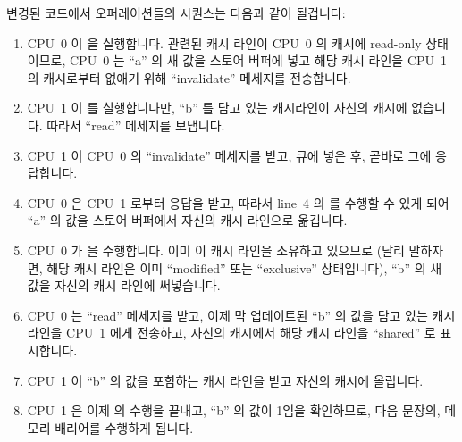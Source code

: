변경된 코드에서 오퍼레이션들의 시퀀스는 다음과 같이 될겁니다:

\begin{enumerate}
\item	CPU~0 이  을 실행합니다.
	관련된 캐시 라인이 CPU~0 의 캐시에 read-only 상태이므로, CPU~0 는 ``a''
	의 새 값을 스토어 버퍼에 넣고 해당 캐시 라인을 CPU~1 의 캐시로부터
	없애기 위해 ``invalidate'' 메세지를 전송합니다.
\item	CPU~1 이  를 실행합니다만, ``b'' 를 담고
	있는 캐시라인이 자신의 캐시에 없습니다.
	따라서 ``read'' 메세지를 보냅니다.
\item	CPU~1 이 CPU~0 의 ``invalidate'' 메세지를 받고, 큐에 넣은 후, 곧바로
	그에 응답합니다.
\item	CPU~0 은 CPU~1 로부터 응답을 받고, 따라서 line~4 의  를
	수행할 수 있게 되어 ``a'' 의 값을 스토어 버퍼에서 자신의 캐시 라인으로
	옮깁니다.

\item	CPU~0 가  을 수행합니다.
	이미 이 캐시 라인을 소유하고 있으므로 (달리 말하자면, 해당 캐시 라인은
	이미 ``modified'' 또는 ``exclusive'' 상태입니다), ``b'' 의 새 값을
	자신의 캐시 라인에 써넣습니다.
\item	CPU~0 는 ``read'' 메세지를 받고, 이제 막 업데이트된 ``b'' 의 값을 담고
	있는 캐시 라인을 CPU~1 에게 전송하고, 자신의 캐시에서 해당 캐시 라인을
	``shared'' 로 표시합니다.
\item	CPU~1 이 ``b'' 의 값을 포함하는 캐시 라인을 받고 자신의 캐시에
	올립니다.
\item	CPU~1 은 이제  의 수행을 끝내고, ``b'' 의
	값이 1임을 확인하므로, 다음 문장의, 메모리 배리어를 수행하게 됩니다.
\iffalse


\end{enumerate}

